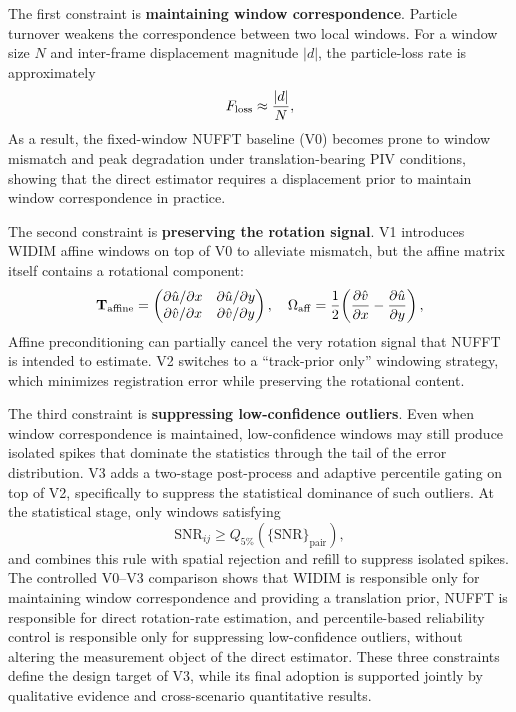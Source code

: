 \documentclass[lettersize,journal]{IEEEtran}
\begin{document}
The first constraint is \textbf{maintaining window correspondence}.
Particle turnover weakens the correspondence between two local windows.
For a window size $N$ and inter-frame displacement magnitude $|d|$, the particle-loss rate is approximately
%
\begin{equation}
  F_{\rm loss} \approx \frac{|d|}{N},
  \label{eq:evo_loss}
\end{equation}
%
As a result, the fixed-window NUFFT baseline (V0) becomes prone to window mismatch and peak degradation under translation-bearing PIV conditions,
showing that the direct estimator requires a displacement prior to maintain window correspondence in practice.

The second constraint is \textbf{preserving the rotation signal}.
V1 introduces WIDIM affine windows on top of V0 to alleviate mismatch,
but the affine matrix itself contains a rotational component:
%
\begin{equation}
  \mathbf{T}_{\rm affine} =
  \begin{pmatrix}
    \partial \hat{u}/\partial x & \partial \hat{u}/\partial y \\
    \partial \hat{v}/\partial x & \partial \hat{v}/\partial y
  \end{pmatrix},
  \quad
  \Omega_{\rm aff} = \frac{1}{2}\!\left(\frac{\partial \hat{v}}{\partial x}
  - \frac{\partial \hat{u}}{\partial y}\right),
  \label{eq:evo_affine}
\end{equation}
%
Affine preconditioning can partially cancel the very rotation signal that NUFFT is intended to estimate.
V2 switches to a ``track-prior only'' windowing strategy,
which minimizes registration error while preserving the rotational content.

The third constraint is \textbf{suppressing low-confidence outliers}.
Even when window correspondence is maintained, low-confidence windows may still produce isolated spikes
that dominate the statistics through the tail of the error distribution.
V3 adds a two-stage post-process and adaptive percentile gating on top of V2,
specifically to suppress the statistical dominance of such outliers.
At the statistical stage, only windows satisfying
%
\begin{equation}
  \mathrm{SNR}_{ij} \geq Q_{5\%}\!\left(\{\mathrm{SNR}\}_{\text{pair}}\right),
  \label{eq:evo_p5}
\end{equation}
%
and combines this rule with spatial rejection and refill to suppress isolated spikes.
The controlled V0--V3 comparison shows that
WIDIM is responsible only for maintaining window correspondence and providing a translation prior,
NUFFT is responsible for direct rotation-rate estimation,
and percentile-based reliability control is responsible only for suppressing low-confidence outliers,
without altering the measurement object of the direct estimator.
These three constraints define the design target of V3,
while its final adoption is supported jointly by qualitative evidence and cross-scenario quantitative results.
\end{document}
